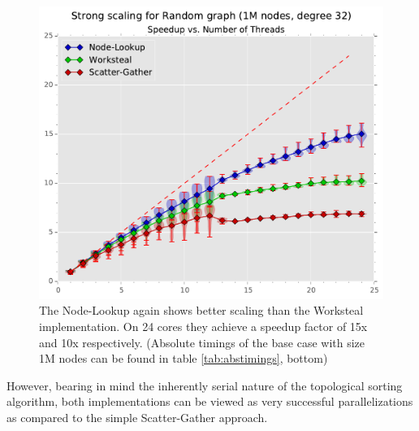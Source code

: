 %
\begin{figure}[ht]
	\centering
	\includegraphics[width=\columnwidth]{plots/strongscaling_gtRANDOMLIN_n1000000_deg32.pdf}
	\caption{The Node-Lookup again shows better scaling than the Worksteal implementation. On 24 cores they achieve a speedup factor of 15x and 10x respectively. (Absolute timings of the base case with size 1M nodes can be found in table \ref{tab:abstimings}, bottom)}
	\label{fig:strongscaling}
\end{figure}
%
However, bearing in mind the inherently serial nature of the topological sorting algorithm, both implementations can be viewed as very successful parallelizations as compared to the simple Scatter-Gather approach.



